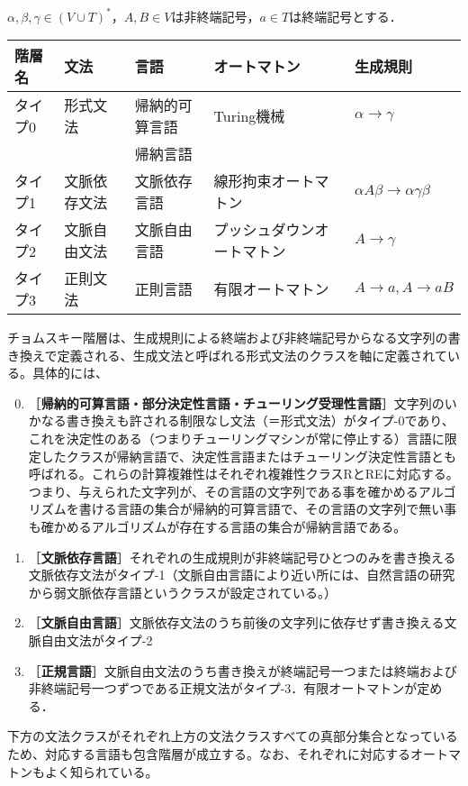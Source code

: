 $\alpha,\beta,\gamma\in(V\cup T)^*$，$A,B\in V$は非終端記号，$a\in T$は終端記号とする．
\begin{center}\begin{tabular}{lllll}\hline
    階層名&文法&言語&オートマトン&生成規則\\\hline
    タイプ0&形式文法&帰納的可算言語&Turing機械&$\alpha\to\gamma$\\
    &&帰納言語\\
    タイプ1&文脈依存文法&文脈依存言語&線形拘束オートマトン&$\alpha A\beta\to\alpha\gamma\beta$\\
    タイプ2&文脈自由文法&文脈自由言語&プッシュダウンオートマトン&$A\to\gamma$\\
    タイプ3&正則文法&正則言語&有限オートマトン&$A\to a,A\to aB$\\\hline
\end{tabular}\end{center}

\begin{remark}[文法の分類]
    チョムスキー階層は、生成規則による終端および非終端記号からなる文字列の書き換えで定義される、生成文法と呼ばれる形式文法のクラスを軸に定義されている。具体的には、
    \begin{enumerate}\setcounter{enumi}{-1}
        \item ［\textbf{帰納的可算言語・部分決定性言語・チューリング受理性言語}］文字列のいかなる書き換えも許される制限なし文法（＝形式文法）がタイプ-0であり、これを決定性のある（つまりチューリングマシンが常に停止する）言語に限定したクラスが帰納言語で、決定性言語またはチューリング決定性言語とも呼ばれる。これらの計算複雑性はそれぞれ複雑性クラスRとREに対応する。つまり、与えられた文字列が、その言語の文字列である事を確かめるアルゴリズムを書ける言語の集合が帰納的可算言語で、その言語の文字列で無い事も確かめるアルゴリズムが存在する言語の集合が帰納言語である。
        \item ［\textbf{文脈依存言語}］それぞれの生成規則が非終端記号ひとつのみを書き換える文脈依存文法がタイプ-1（文脈自由言語により近い所には、自然言語の研究から弱文脈依存言語というクラスが設定されている。）
        \item ［\textbf{文脈自由言語}］文脈依存文法のうち前後の文字列に依存せず書き換える文脈自由文法がタイプ-2
        \item ［\textbf{正規言語}］文脈自由文法のうち書き換えが終端記号一つまたは終端および非終端記号一つずつである正規文法がタイプ-3．有限オートマトンが定める．
    \end{enumerate}
    下方の文法クラスがそれぞれ上方の文法クラスすべての真部分集合となっているため、対応する言語も包含階層が成立する。なお、それぞれに対応するオートマトンもよく知られている。
\end{remark}

